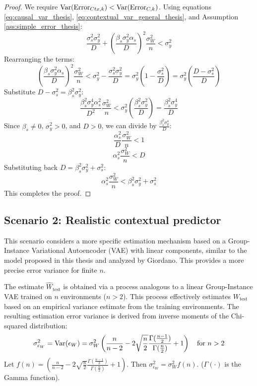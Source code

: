 \documentclass[../thesis.tex]{subfiles}
\begin{document}
\begin{proof}
We require $\mathrm{Var}(\text{Error}_{Ctx,k}) < \mathrm{Var}(\text{Error}_{C,k})$. Using equations \eqref{eq:causal_var_thesis}, \eqref{eq:contextual_var_general_thesis}, and Assumption \ref{ass:simple_error_thesis}:
\[ \frac{\sigma_s^2 \sigma_y^2}{D} + \left(\frac{\beta_s \sigma_y^2 \alpha_s}{D}\right)^2 \frac{\sigma_W^2}{n} < \sigma_y^2 \]
Rearranging the terms:
\[ \left(\frac{\beta_s \sigma_y^2 \alpha_s}{D}\right)^2 \frac{\sigma_W^2}{n} < \sigma_y^2 - \frac{\sigma_s^2 \sigma_y^2}{D} = \sigma_y^2 \left(1 - \frac{\sigma_s^2}{D}\right) = \sigma_y^2 \left(\frac{D - \sigma_s^2}{D}\right) \]
Substitute $D - \sigma_s^2 = \beta_s^2 \sigma_y^2$:
\[ \frac{\beta_s^2 \sigma_y^4 \alpha_s^2}{D^2} \frac{\sigma_W^2}{n} < \sigma_y^2 \left(\frac{\beta_s^2 \sigma_y^2}{D}\right) = \frac{\beta_s^2 \sigma_y^4}{D} \]
Since $\beta_s \neq 0$, $\sigma_y^2 > 0$, and $D > 0$, we can divide by $\frac{\beta_s^2 \sigma_y^4}{D}$:
\[ \frac{\alpha_s^2}{D} \frac{\sigma_W^2}{n} < 1 \]
\[ \alpha_s^2 \frac{\sigma_W^2}{n} < D \]
Substituting back $D = \beta_s^2 \sigma_y^2 + \sigma_s^2$:
\[ \alpha_s^2 \frac{\sigma_W^2}{n} < \beta_s^2 \sigma_y^2 + \sigma_s^2 \]
This completes the proof.
\end{proof}

\subsection{Scenario 2: Realistic contextual predictor}

This scenario considers a more specific estimation mechanism based on a Group-Instance Variational Autoencoder (VAE) with linear components, similar to the model proposed in this thesis and analyzed by Giordano. This provides a more precise error variance for finite $n$.

\begin{assumption}
\label{ass:vae_error_thesis}
The estimate $\hat{W}_{\text{test}}$ is obtained via a process analogous to a linear Group-Instance VAE trained on $n$ environments ($n>2$). This process effectively estimates $W_{\text{test}}$ based on an empirical variance estimate from the training environments. The resulting estimation error variance is derived from inverse moments of the Chi-squared distribution:
\[ \sigma_{\epsilon_W}^2 = \mathrm{Var}(\epsilon_W) = \sigma_W^2 \left( \frac{n}{n-2} - 2 \sqrt{\frac{n}{2}} \frac{\Gamma(\frac{n-1}{2})}{\Gamma(\frac{n}{2})} + 1 \right) \quad \text{for } n > 2 \]
Let $f(n) = \left( \frac{n}{n-2} - 2 \sqrt{\frac{n}{2}} \frac{\Gamma(\frac{n-1}{2})}{\Gamma(\frac{n}{2})} + 1 \right)$. Then $\sigma_{\epsilon_W}^2 = \sigma_W^2 f(n)$. ($\Gamma(\cdot)$ is the Gamma function).
\end{assumption}
\end{document}
